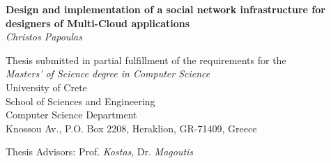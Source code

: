 \begin{titlepage}
\begin{center}

\LARGE \textbf{Design and implementation of a social network infrastructure for designers of Multi-Cloud applications}\\[0.5cm]
\LARGE \textit{Christos Papoulas}\\[0.5cm]

\vfill

\normalsize{
Thesis submitted in partial fulfillment of the requirements for the\\[0.30cm]

\textit{Masters' of Science degree in Computer Science}}\\[0.30cm]

University of Crete\\
School of Sciences and Engineering\\
Computer Science Department\\
Knossou Av., P.O. Box 2208, Heraklion, GR-71409, Greece\\[0.5cm]

\vfill

\Large{Thesis Advisors: Prof. \emph{Kostas}, Dr. \emph{Magoutis}}\\[0.5cm]

\vfill

\end{center}

\worksupportedby{}
\end{titlepage}
